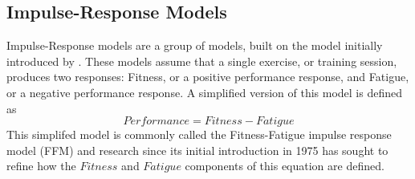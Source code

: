\subsection{Impulse-Response Models} 
Impulse-Response models are a group of models, built on the model initially introduced by \textcite{Bannister1976}. These models assume that a single exercise, or training session, produces two responses: Fitness, or a positive performance response, and Fatigue, or a negative performance response. A simplified version of this model is defined as 
\begin{equation}\label{eq:ffm}
  Performance = Fitness - Fatigue
\end{equation}
This simplifed model is commonly called the Fitness-Fatigue impulse response model (FFM) and research since its initial introduction in 1975 has sought to refine how the $Fitness$ and $Fatigue$ components of this equation are defined.

